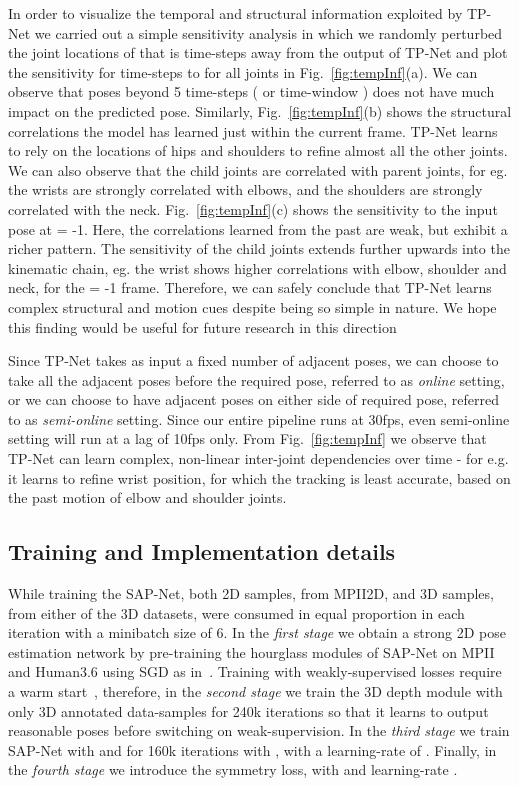 \documentclass[runningheads]{llncs}
\begin{document}
In order to visualize the temporal and structural information exploited by TP-Net we carried out a simple sensitivity analysis in which we randomly perturbed the joint locations of  that is  time-steps away from the output of TP-Net  and plot the sensitivity for time-steps  to  for all joints in Fig.~\ref{fig:tempInf}(a). We can observe that poses beyond 5 time-steps ( or  time-window ) does not have much impact on the predicted pose. Similarly, Fig.~\ref{fig:tempInf}(b) shows the structural correlations the model has learned just within the current frame. TP-Net learns to rely on the locations of hips and shoulders to refine almost all the other joints. We can also observe that the child joints are correlated with parent joints, for eg. the wrists are strongly correlated with elbows, and the shoulders are strongly correlated with the neck. Fig.~\ref{fig:tempInf}(c) shows the sensitivity to the input pose at  = -1. Here, the correlations learned from the past are weak, but exhibit a richer pattern. The sensitivity of the child joints extends further upwards into the kinematic chain, eg. the wrist shows higher correlations with elbow, shoulder and neck, for the  = -1 frame. Therefore, we can safely conclude that TP-Net learns complex structural and motion cues despite being so simple in nature. We hope this finding would be useful for future research in this direction

Since TP-Net takes as input a fixed number of adjacent poses, we can choose to take all the adjacent poses before the required pose, referred to as \emph{online} setting, or we can choose to have  adjacent poses on either side of required pose, referred to as \emph{semi-online} setting. Since our entire pipeline runs at 30fps, even semi-online setting will run at a lag of 10fps only. From Fig.~\ref{fig:tempInf} we observe that TP-Net can learn complex, non-linear inter-joint dependencies over time - for e.g. it learns to refine wrist position, for which the tracking is least accurate, based on the past motion of elbow and shoulder joints.

\subsection{Training and Implementation details} \label{sec:training}
While training the SAP-Net, both 2D samples, from MPII2D, and 3D samples, from either of the 3D datasets, were consumed in equal proportion in each iteration with a minibatch size of 6. In the \emph{first stage} we obtain a strong 2D pose estimation network by pre-training the hourglass modules of SAP-Net on MPII and Human3.6 using SGD as in~\cite{NewellYD16}. Training with weakly-supervised losses require a warm start~\cite{zhou2017brief}, therefore, in the \emph{second stage} we train the 3D depth module with only 3D annotated data-samples for 240k iterations so that it learns to output reasonable poses before switching on weak-supervision. In the \emph{third stage} we train SAP-Net with  and  for 160k iterations with ,  with a learning-rate of . Finally, in the \emph{fourth stage} we introduce the symmetry loss,  with  and learning-rate . 
\end{document}
